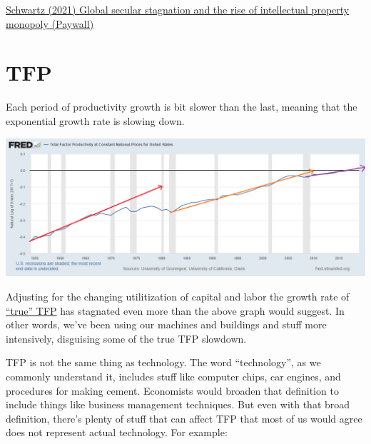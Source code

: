 \documentclass[
]{book}
\begin{document}
\href{https://www.tandfonline.com/doi/abs/10.1080/09692290.2021.1918745}{Schwartz (2021) Global secular stagnation and the rise of intellectual property monopoly (Paywall)}

\hypertarget{tfp}{%
\section{TFP}\label{tfp}}

Each period of productivity growth is bit slower than the last,
meaning that the exponential growth rate is slowing down.

\includegraphics{fig/TFP_US_Log.png}

Adjusting for the changing utilitization of capital and labor the growth rate
of \href{https://growthecon.com/blog/BLS-TFP/}{``true'' TFP} has stagnated even more than the above graph would suggest.
In other words, we've been using our machines and buildings and stuff more intensively,
disguising some of the true TFP slowdown.

TFP is not the same thing as technology. The word ``technology'', as we commonly understand it, includes stuff like computer chips, car engines, and procedures for making cement. Economists would broaden that definition to include things like business management techniques. But even with that broad definition, there's plenty of stuff that can affect TFP that most of us would agree does not represent actual technology. For example:
\end{document}
